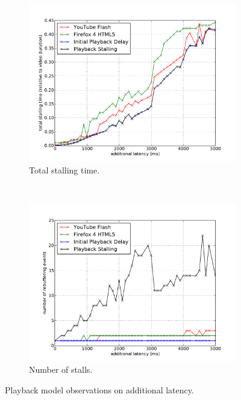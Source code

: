 \begin{figure}
	\centering
    	\begin{subfigure}[b]{0.50\textwidth}
                \centering
                \includegraphics[width=\textwidth]{images/streaming/eval-latency-stallingtime.pdf}
                \caption{Total stalling time.}
                \label{fig:eval-latency-stallingtime}
        \end{subfigure}%
        ~
    	\begin{subfigure}[b]{0.50\textwidth}
                \centering
                \includegraphics[width=\textwidth]{images/streaming/eval-latency-frequency.pdf}
                \caption{Number of stalls.}
                \label{fig:eval-latency-numstalls}
        \end{subfigure}
	\caption{Playback model observations on additional latency.}
	\label{fig:eval-latency}
\end{figure}


